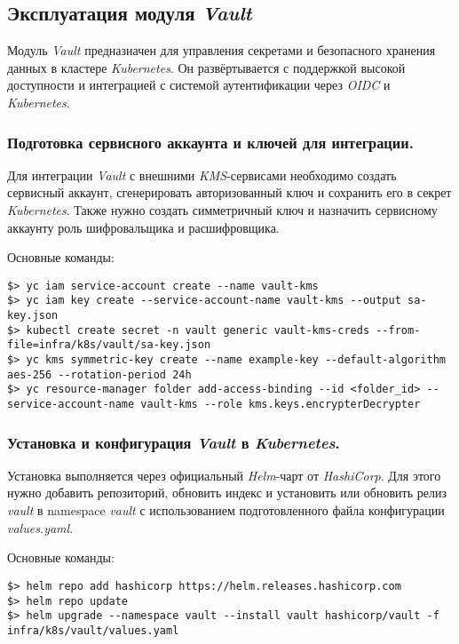 \subsection{Эксплуатация модуля \textit{Vault}}

Модуль \textit{Vault} предназначен для управления секретами и безопасного хранения данных в кластере \textit{Kubernetes}. Он развёртывается с поддержкой высокой доступности и интеграцией с системой аутентификации через \textit{OIDC} и \textit{Kubernetes}.

\subsubsection{Подготовка сервисного аккаунта и ключей для интеграции.} Для интеграции \textit{Vault} с внешними \textit{KMS}-сервисами необходимо создать сервисный аккаунт, сгенерировать авторизованный ключ и сохранить его в секрет \textit{Kubernetes}. Также нужно создать симметричный ключ и назначить сервисному аккаунту роль шифровальщика и расшифровщика.

Основные команды:

\begin{lstlisting}
$> yc iam service-account create --name vault-kms
$> yc iam key create --service-account-name vault-kms --output sa-key.json
$> kubectl create secret -n vault generic vault-kms-creds --from-file=infra/k8s/vault/sa-key.json
$> yc kms symmetric-key create --name example-key --default-algorithm aes-256 --rotation-period 24h
$> yc resource-manager folder add-access-binding --id <folder_id> --service-account-name vault-kms --role kms.keys.encrypterDecrypter
\end{lstlisting}

\subsubsection{Установка и конфигурация \textit{Vault} в \textit{Kubernetes}.} Установка выполняется через официальный \textit{Helm}-чарт от \textit{HashiCorp}. Для этого нужно добавить репозиторий, обновить индекс и установить или обновить релиз \textit{vault} в namespace \textit{vault} с использованием подготовленного файла конфигурации \textit{values.yaml}.

Основные команды:

\begin{lstlisting}
$> helm repo add hashicorp https://helm.releases.hashicorp.com
$> helm repo update
$> helm upgrade --namespace vault --install vault hashicorp/vault -f infra/k8s/vault/values.yaml
\end{lstlisting}

